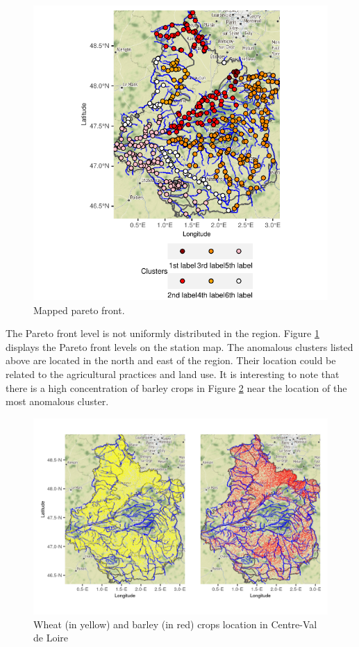 \begin{figure}[htbp]
  \centering
  \includegraphics[]{figs/Chap5/Pareto_map.pdf}
  \caption{Mapped pareto front.}
  \label{fig:pareto:map}
\end{figure}

The Pareto front level is not uniformly distributed in the region. Figure \ref{fig:pareto:map} displays the Pareto front levels on the station map. The anomalous clusters listed above are located in the north and east of the region. Their location could be related to the agricultural practices and land use. It is interesting to note that there is a high concentration of barley crops in Figure \ref{fig:crops} near the location of the most anomalous cluster. 

\begin{figure}[htbp]
    \centering
    \includegraphics{figs/App/Occ_soil.png}
    \caption{Wheat (in yellow) and barley (in red) crops location in Centre-Val de Loire}
    \label{fig:crops}
\end{figure} 


